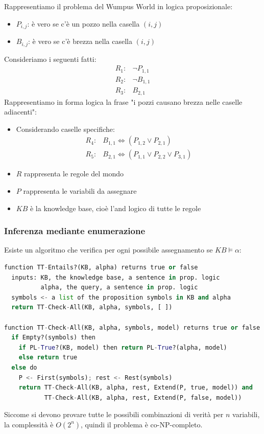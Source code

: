 \documentclass[a4paper]{article}
\begin{document}
\begin{example}
  Rappresentiamo il problema del Wumpus World in logica proposizionale:
  \begin{itemize}
    \item \( P_{i,j} \): è vero se c'è un pozzo nella casella \( (i,j) \)
    \item \( B_{i,j} \): è vero se c'è brezza nella casella \( (i,j) \)
  \end{itemize}
  Consideriamo i seguenti fatti:
  \[
    \begin{aligned}
      R_1: & \neg P_{1,1} \\
      R_2: & \neg B_{1,1}\\
      R_3: & B_{2,1}
    \end{aligned}
  \] 
  Rappresentiamo in forma logica la frase "i pozzi causano brezza nelle caselle adiacenti":
  \begin{itemize}
    \item Considerando caselle specifiche:
      \[
        \begin{aligned}
          R_4: &B_{1,1} \iff (P_{1,2} \vee  P_{2,1})\\
          R_5: &B_{2,1} \iff (P_{1,1} \lor P_{2,2} \lor P_{3,1})
        \end{aligned}
      \] 
  \end{itemize}

  \begin{itemize}
    \item \( R \) rappresenta le regole del mondo
    \item \( P \) rappresenta le variabili da assegnare
    \item \( KB \) è la knowledge base, cioè l'and logico di tutte le regole
  \end{itemize}
\end{example}

\subsubsection{Inferenza mediante enumerazione}
Esiste un algoritmo che verifica per ogni possibile assegnamento se \( KB \models \alpha \):
\begin{lstlisting}[language=Python]
function TT-Entails?(KB, alpha) returns true or false
  inputs: KB, the knowledge base, a sentence in prop. logic
          alpha, the query, a sentence in prop. logic
  symbols <- a list of the proposition symbols in KB and alpha
  return TT-Check-All(KB, alpha, symbols, [ ])

function TT-Check-All(KB, alpha, symbols, model) returns true or false
  if Empty?(symbols) then
    if PL-True?(KB, model) then return PL-True?(alpha, model)
    else return true
  else do
    P <- First(symbols); rest <- Rest(symbols)
    return TT-Check-All(KB, alpha, rest, Extend(P, true, model)) and
           TT-Check-All(KB, alpha, rest, Extend(P, false, model))
\end{lstlisting}
Siccome si devono provare tutte le possibili combinazioni di verità per \( n \)
variabili, la complessità è \( O(2^n) \), quindi il problema è co-NP-completo.
\end{document}
